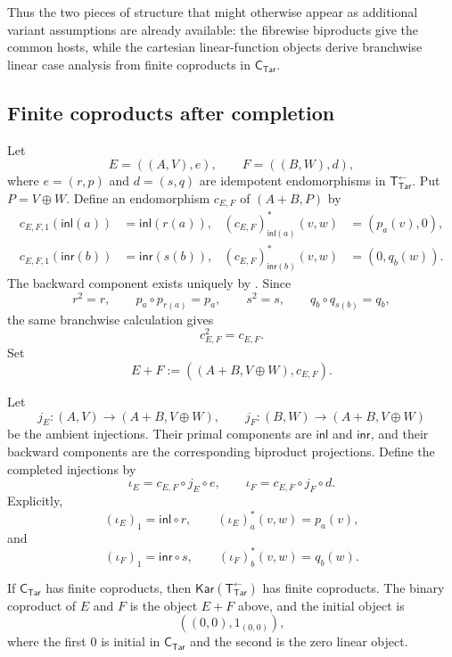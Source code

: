 \documentclass[runningheads,envcountsame]{llncs}
\newcommand{\Tar}{\mathsf{Tar}}
\newcommand{\CTar}{\mathsf C_{\Tar}}
\newcommand{\TotTar}{\mathsf T_{\Tar}^{\leftarrow}}
\newcommand{\Kar}{\mathsf{Kar}}
\begin{document}
Thus the two pieces of structure that might otherwise appear as additional
variant assumptions are already available: the fibrewise biproducts give the
common hosts, while the cartesian linear-function objects derive branchwise
linear case analysis from finite coproducts in $\CTar$.

\subsection{Finite coproducts after completion}

Let
$$
E=((A,V),e),
\qquad
F=((B,W),d),
$$
where $e=(r,p)$ and $d=(s,q)$ are idempotent endomorphisms in $\TotTar$.
Put $P=V\oplus W$. Define an endomorphism $c_{E,F}$ of
$(A+B,P)$ by
$$
\begin{aligned}
c_{E,F,1}(\mathsf{inl}(a))
&=\mathsf{inl}(r(a)),
&
(c_{E,F})^*_{\mathsf{inl}(a)}(v,w)
&=(p_a(v),0),\\
c_{E,F,1}(\mathsf{inr}(b))
&=\mathsf{inr}(s(b)),
&
(c_{E,F})^*_{\mathsf{inr}(b)}(v,w)
&=(0,q_b(w)).
\end{aligned}
$$
The backward component exists uniquely by
. Since
$$
r^2=r,
\qquad
p_a\circ p_{r(a)}=p_a,
\qquad
s^2=s,
\qquad
q_b\circ q_{s(b)}=q_b,
$$
the same branchwise calculation gives
$$
c_{E,F}^2=c_{E,F}.
$$
Set
$$
E+F:=((A+B,V\oplus W),c_{E,F}).
$$

Let
$$
j_E:(A,V)\longrightarrow(A+B,V\oplus W),
\qquad
j_F:(B,W)\longrightarrow(A+B,V\oplus W)
$$
be the ambient injections. Their primal components are
$\mathsf{inl}$ and $\mathsf{inr}$, and their backward components are the
corresponding biproduct projections. Define the completed injections by
$$
\iota_E=c_{E,F}\circ j_E\circ e,
\qquad
\iota_F=c_{E,F}\circ j_F\circ d.
$$
Explicitly,
$$
(\iota_E)_1=\mathsf{inl}\circ r,
\qquad
(\iota_E)^*_a(v,w)=p_a(v),
$$
and
$$
(\iota_F)_1=\mathsf{inr}\circ s,
\qquad
(\iota_F)^*_b(v,w)=q_b(w).
$$

\begin{proposition}
\label{prop:target-coproducts-app}
If $\CTar$ has finite coproducts, then $\Kar(\TotTar)$ has finite
coproducts. The binary coproduct of $E$ and $F$ is the object $E+F$ above, and
the initial object is
$$
((0,0),1_{(0,0)}),
$$
where the first $0$ is initial in $\CTar$ and the second is the zero linear
object.
\end{proposition}
\end{document}
